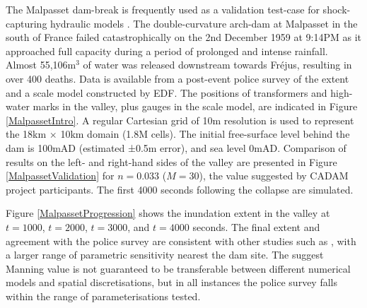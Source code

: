 The Malpasset dam-break is frequently used as a validation test-case for shock-capturing hydraulic models \citep{Goutal1999}. The double-curvature arch-dam at Malpasset in the south of France failed catastrophically on the 2nd December 1959 at 9:14PM as it approached full capacity during a period of prolonged and intense rainfall. Almost 55,106m\(^{3}\) of water was released downstream towards Fr{\'e}jus, resulting in over 400 deaths. Data is available from a post-event police survey of the extent and a scale model constructed by EDF. The positions of transformers and high-water marks in the valley, plus gauges in the scale model, are indicated in Figure \ref{MalpassetIntro}. A regular Cartesian grid of 10m resolution is used to represent the 18km \(\times\) 10km domain (1.8M cells). The initial free-surface level behind the dam is 100mAD (estimated ±0.5m error), and sea level 0mAD. Comparison of results on the left- and right-hand sides of the valley are presented in Figure \ref{MalpassetValidation} for \(n=0.033\) (\(M=30\)), the value suggested by CADAM project participants.  The first 4000 seconds following the collapse are simulated.

Figure \ref{MalpassetProgression} shows the inundation extent in the valley at \(t=1000\), \(t=2000\), \(t=3000\), and \(t=4000\) seconds. The final extent and agreement with the police survey are consistent with other studies such as \citet{Brodtkorb2011}, with a larger range of parametric sensitivity nearest the dam site. The suggest Manning value is not guaranteed to be transferable between different numerical models and spatial discretisations, but in all instances the police survey falls within the range of parameterisations tested.

